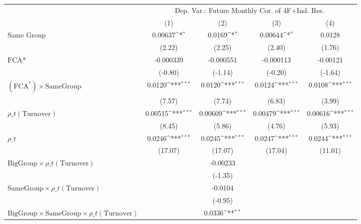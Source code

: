 {
\def\sym#1{\ifmmode^{#1}\else\(^{#1}\)\fi}
\begin{tabular}{l*{4}{c}}
\hline\hline
                &\multicolumn{4}{c}{Dep. Var.: Future Monthly Cor.  of 4F+Ind. Res.}        \\\cmidrule(lr){2-5}
                &\multicolumn{1}{c}{(1)}         &\multicolumn{1}{c}{(2)}         &\multicolumn{1}{c}{(3)}         &\multicolumn{1}{c}{(4)}         \\
\hline
Same Group      &  0.00637\sym{*}  &   0.0169\sym{*}  &  0.00644\sym{*}  &   0.0128         \\
                &   (2.22)         &   (2.25)         &   (2.40)         &   (1.76)         \\
[1em]
$ \text{FCA*} $ &-0.000339         &-0.000551         &-0.000113         & -0.00121         \\
                &  (-0.80)         &  (-1.14)         &  (-0.20)         &  (-1.64)         \\
[1em]
 $ (\text{FCA}^*) \times {\text{SameGroup} }  $ &   0.0120\sym{***}&   0.0120\sym{***}&   0.0124\sym{***}&   0.0108\sym{***}\\
                &   (7.57)         &   (7.74)         &   (6.83)         &   (3.99)         \\
[1em]
 $ {\rho\_t(\text{Turnover})} $ &  0.00515\sym{***}&  0.00609\sym{***}&  0.00479\sym{***}&  0.00616\sym{***}\\
                &   (8.45)         &   (5.86)         &   (4.76)         &   (5.93)         \\
[1em]
 $ {\rho\_t} $   &   0.0246\sym{***}&   0.0245\sym{***}&   0.0247\sym{***}&   0.0244\sym{***}\\
                &  (17.07)         &  (17.07)         &  (17.04)         &  (11.01)         \\
[1em]
$ {\text{BigGroup} } \times  {\rho\_t(\text{Turnover})}  $ &                  & -0.00233         &                  &                  \\
                &                  &  (-1.35)         &                  &                  \\
[1em]
$ {\text{SameGroup} \times  {\rho\_t(\text{Turnover})}}  $ &                  &  -0.0104         &                  &                  \\
                &                  &  (-0.95)         &                  &                  \\
[1em]
$ {\text{BigGroup} } \times {\text{SameGroup} } \times  {\rho\_t(\text{Turnover})}$ &                  &   0.0336\sym{**} &                  &                  \\

\end{tabular}}
